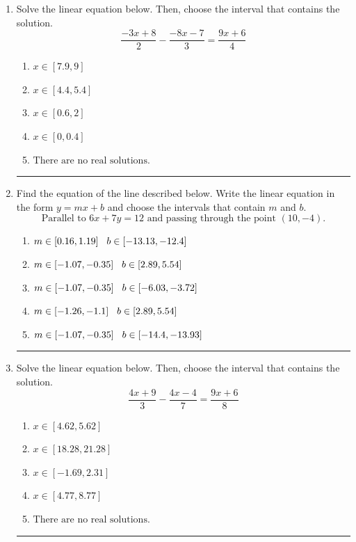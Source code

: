\documentclass[14pt]{extbook}
\newcommand{\litem}[1]{\item#1\hspace*{-1cm}\rule{\textwidth}{0.4pt}}
\begin{document}
\begin{enumerate}
{\begin{enumerate}[label=\Alph*.]
\end{enumerate} }
\litem{
Solve the linear equation below. Then, choose the interval that contains the solution.\[ \frac{-3x + 8}{2} - \frac{-8x -7}{3} = \frac{9x + 6}{4} \]\begin{enumerate}[label=\Alph*.]
\item \( x \in [7.9, 9] \)
\item \( x \in [4.4, 5.4] \)
\item \( x \in [0.6, 2] \)
\item \( x \in [0, 0.4] \)
\item \( \text{There are no real solutions.} \)

\end{enumerate} }
\litem{
Find the equation of the line described below. Write the linear equation in the form $ y=mx+b $ and choose the intervals that contain $m$ and $b$.\[ \text{Parallel to } 6 x + 7 y = 12 \text{ and passing through the point } (10, -4). \]\begin{enumerate}[label=\Alph*.]
\item \( m \in [0.16, 1.19] \hspace*{3mm} b \in [-13.13, -12.4] \)
\item \( m \in [-1.07, -0.35] \hspace*{3mm} b \in [2.89, 5.54] \)
\item \( m \in [-1.07, -0.35] \hspace*{3mm} b \in [-6.03, -3.72] \)
\item \( m \in [-1.26, -1.1] \hspace*{3mm} b \in [2.89, 5.54] \)
\item \( m \in [-1.07, -0.35] \hspace*{3mm} b \in [-14.4, -13.93] \)

\end{enumerate} }
\litem{
Solve the linear equation below. Then, choose the interval that contains the solution.\[ \frac{4x + 9}{3} - \frac{4x -4}{7} = \frac{9x + 6}{8} \]\begin{enumerate}[label=\Alph*.]
\item \( x \in [4.62, 5.62] \)
\item \( x \in [18.28, 21.28] \)
\item \( x \in [-1.69, 2.31] \)
\item \( x \in [4.77, 8.77] \)
\item \( \text{There are no real solutions.} \)


\end{enumerate}}
\end{enumerate}
\end{document}
